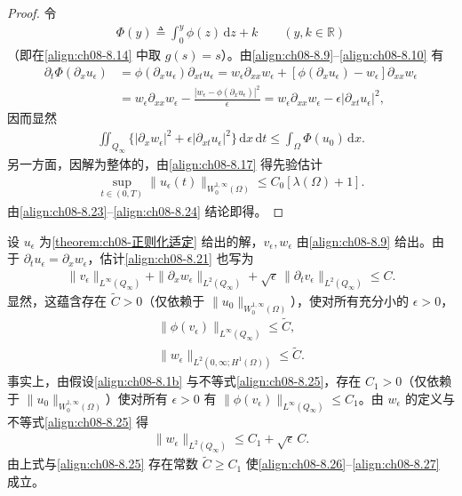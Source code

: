 \documentclass[../../main.tex]{subfiles}%
\begin{document}
\begin{proof}
令
\begin{align}
\Phi(y)\triangleq \int_0^y\phi(z)\,\mathrm{d}z+k\qquad(y,k\in\mathbb{R}) \label{align:ch08-8.22}
\end{align}
（即在\eqref{align:ch08-8.14} 中取 $g(s)=s$）。由\eqref{align:ch08-8.9}--\eqref{align:ch08-8.10} 有
\begin{align*}
\partial_t\Phi(\partial_x u_\epsilon)
&=\phi(\partial_x u_\epsilon)\partial_{xt}u_\epsilon
=w_\epsilon\partial_{xx}w_\epsilon+[\phi(\partial_x u_\epsilon)-w_\epsilon]\partial_{xx}w_\epsilon\\
&=w_\epsilon\partial_{xx}w_\epsilon-\frac{|w_\epsilon-\phi(\partial_x u_\epsilon)|^2}{\epsilon}
=w_\epsilon\partial_{xx}w_\epsilon-\epsilon|\partial_{xt}u_\epsilon|^2,
\end{align*}
因而显然
\begin{align}
\iint_{Q_\infty}\{|\partial_x w_\epsilon|^2+\epsilon|\partial_{xt}u_\epsilon|^2\}\,\mathrm{d}x\,\mathrm{d}t
\leqslant\int_\Omega\Phi(u_0)\,\mathrm{d}x. \label{align:ch08-8.23}
\end{align}
另一方面，因解为整体的，由\eqref{align:ch08-8.17} 得先验估计
\begin{align}
\sup_{t\in(0,T)}\|u_\epsilon(t)\|_{W^{1,\infty}_0(\Omega)}\leqslant C_0[\lambda(\Omega)+1]. \label{align:ch08-8.24}
\end{align}
由\eqref{align:ch08-8.23}--\eqref{align:ch08-8.24} 结论即得。
\end{proof}

\begin{remark}\label{remark:ch08-估计改写}
设 $u_\epsilon$ 为\cref{theorem:ch08-正则化适定} 给出的解，$v_\epsilon,w_\epsilon$ 由\eqref{align:ch08-8.9} 给出。由于 $\partial_t u_\epsilon=\partial_x w_\epsilon$，估计\eqref{align:ch08-8.21} 也写为
\begin{align}
\|v_\epsilon\|_{L^\infty(Q_\infty)}+\|\partial_x w_\epsilon\|_{L^2(Q_\infty)}
+\sqrt{\epsilon}\,\|\partial_t v_\epsilon\|_{L^2(Q_\infty)}\leqslant C. \label{align:ch08-8.25}
\end{align}
显然，这蕴含存在 $\widetilde C>0$（仅依赖于 $\|u_0\|_{W^{1,\infty}_0(\Omega)}$），使对所有充分小的 $\epsilon>0$，
\begin{align}
\|\phi(v_\epsilon)\|_{L^\infty(Q_\infty)}\leqslant\widetilde C, \label{align:ch08-8.26}\\
\|w_\epsilon\|_{L^2(0,\infty;H^1(\Omega))}\leqslant\widetilde C. \label{align:ch08-8.27}
\end{align}
事实上，由假设\eqref{align:ch08-8.1b} 与不等式\eqref{align:ch08-8.25}，存在 $C_1>0$（仅依赖于 $\|u_0\|_{W^{1,\infty}_0(\Omega)}$）使对所有 $\epsilon>0$ 有 $\|\phi(v_\epsilon)\|_{L^\infty(Q_\infty)}\leqslant C_1$。由 $w_\epsilon$ 的定义与不等式\eqref{align:ch08-8.25} 得
\begin{align*}
\|w_\epsilon\|_{L^2(Q_\infty)}\leqslant C_1+\sqrt{\epsilon}\,C.
\end{align*}
由上式与\eqref{align:ch08-8.25} 存在常数 $\widetilde C\geqslant C_1$ 使\eqref{align:ch08-8.26}--\eqref{align:ch08-8.27} 成立。
\end{remark}
\end{document}
